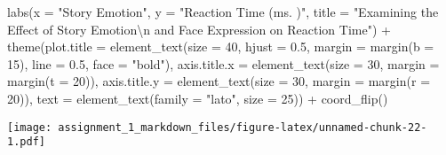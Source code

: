 \documentclass[
]{article}
\newenvironment{Shaded}{\begin{snugshade}}{\end{snugshade}}
\newcommand{\AttributeTok}[1]{\textcolor[rgb]{0.77,0.63,0.00}{#1}}
\newcommand{\DecValTok}[1]{\textcolor[rgb]{0.00,0.00,0.81}{#1}}
\newcommand{\FloatTok}[1]{\textcolor[rgb]{0.00,0.00,0.81}{#1}}
\newcommand{\FunctionTok}[1]{\textcolor[rgb]{0.00,0.00,0.00}{#1}}
\newcommand{\NormalTok}[1]{#1}
\newcommand{\SpecialCharTok}[1]{\textcolor[rgb]{0.00,0.00,0.00}{#1}}
\newcommand{\StringTok}[1]{\textcolor[rgb]{0.31,0.60,0.02}{#1}}
\begin{document}
\begin{Shaded}
\begin{Highlighting}[]
  \FunctionTok{labs}\NormalTok{(}\AttributeTok{x =} \StringTok{"Story Emotion"}\NormalTok{,}
       \AttributeTok{y =} \StringTok{"Reaction Time (ms. )"}\NormalTok{,}
       \AttributeTok{title =} \StringTok{"Examining the Effect of Story Emotion}\SpecialCharTok{\textbackslash{}n}\StringTok{ and Face Expression on Reaction Time"}\NormalTok{) }\SpecialCharTok{+}
  \FunctionTok{theme}\NormalTok{(}\AttributeTok{plot.title =} \FunctionTok{element\_text}\NormalTok{(}\AttributeTok{size =} \DecValTok{40}\NormalTok{, }\AttributeTok{hjust =} \FloatTok{0.5}\NormalTok{, }\AttributeTok{margin =} \FunctionTok{margin}\NormalTok{(}\AttributeTok{b =} \DecValTok{15}\NormalTok{), }\AttributeTok{line =} \FloatTok{0.5}\NormalTok{, }\AttributeTok{face =} \StringTok{"bold"}\NormalTok{),}
        \AttributeTok{axis.title.x =} \FunctionTok{element\_text}\NormalTok{(}\AttributeTok{size =} \DecValTok{30}\NormalTok{, }\AttributeTok{margin =} \FunctionTok{margin}\NormalTok{(}\AttributeTok{t =} \DecValTok{20}\NormalTok{)),}
        \AttributeTok{axis.title.y =} \FunctionTok{element\_text}\NormalTok{(}\AttributeTok{size =} \DecValTok{30}\NormalTok{, }\AttributeTok{margin =} \FunctionTok{margin}\NormalTok{(}\AttributeTok{r =} \DecValTok{20}\NormalTok{)),}
        \AttributeTok{text =} \FunctionTok{element\_text}\NormalTok{(}\AttributeTok{family =} \StringTok{"lato"}\NormalTok{, }\AttributeTok{size =} \DecValTok{25}\NormalTok{)) }\SpecialCharTok{+}
  \FunctionTok{coord\_flip}\NormalTok{()}
\end{Highlighting}
\end{Shaded}

\texttt{[image: assignment\_1\_markdown\_files/figure-latex/unnamed-chunk-22-1.pdf]}
\end{document}
